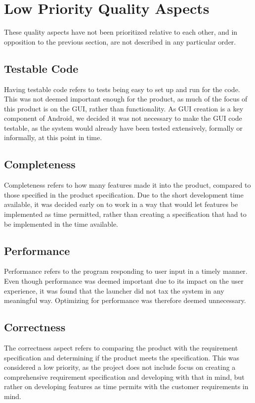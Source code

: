 \section{Low Priority Quality Aspects}
These quality aspects have not been prioritized relative to each other, and in opposition to the previous section, are not described in any particular order. 

\subsection{Testable Code}
Having testable code refers to tests being easy to set up and run for the code. 
This was not deemed important enough for the product, as much of the focus of this product is on the GUI, rather than functionality. 
As GUI creation is a key component of Android, we decided it was not necessary to make the GUI code testable, as the system would already have been tested extensively, formally or informally, at this point in time. 

\subsection{Completeness}
Completeness refers to how many features made it into the product, compared to those specified in the product specification. 
Due to the short development time available, it was decided early on to work in a way that would let features be implemented as time permitted, rather than creating a specification that had to be implemented in the time available.

\subsection{Performance}
Performance refers to the program responding to user input in a timely manner. 
Even though performance was deemed important due to its impact on the user experience, it was found that the launcher did not tax the system in any meaningful way.
Optimizing for performance was therefore deemed unnecessary.

\subsection{Correctness}
The correctness aspect refers to comparing the product with the requirement specification and determining if the product meets the specification. 
This was considered a low priority, as the project does not include focus on creating a comprehensive requirement specification and developing with that in mind, but rather on developing features as time permits with the customer requirements in mind.

